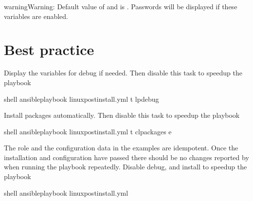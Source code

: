 \documentclass[letterpaper,10pt,english]{sphinxmanual}
\begin{document}
\begin{sphinxadmonition}{warning}{Warning:}
Default value of  and
 is . Passwords will be
displayed if these variables are enabled.
\end{sphinxadmonition}


\section{Best practice}
\label{\detokenize{guide:best-practice}}\label{\detokenize{guide:ug-bp}}
Display the variables for debug if needed. Then disable this task
 to speedup the playbook

%
\begin{sphinxVerbatim}[commandchars=\\\{\}]
shell\PYGZgt{} ansible\PYGZhy{}playbook linux\PYGZhy{}postinstall.yml \PYGZhy{}t lp\PYGZus{}debug
\end{sphinxVerbatim}
\sphinxresetverbatimhllines

Install packages automatically. Then disable this task
 to speedup the playbook

%
\begin{sphinxVerbatim}[commandchars=\\\{\}]
shell\PYGZgt{} ansible\PYGZhy{}playbook linux\PYGZhy{}postinstall.yml \PYGZhy{}t cl\PYGZus{}packages 
                                              \PYGZhy{}e 
\end{sphinxVerbatim}
\sphinxresetverbatimhllines

The role and the configuration data in the examples are
idempotent. Once the installation and configuration have passed there
should be no changes reported by  when running the
playbook repeatedly. Disable debug, and install to speedup the
playbook

%
\begin{sphinxVerbatim}[commandchars=\\\{\}]
 shell\PYGZgt{} ansible\PYGZhy{}playbook linux\PYGZhy{}postinstall.yml
\end{sphinxVerbatim}
\sphinxresetverbatimhllines
\end{document}

